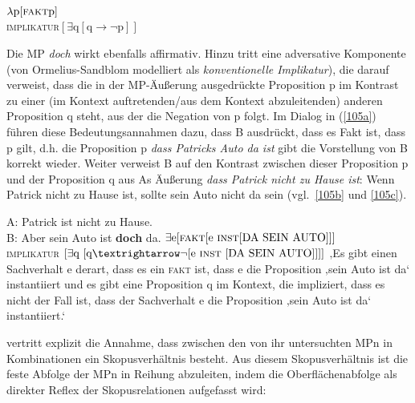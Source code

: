 \begin{exe}
	\ex\label{104} 
		$\lambda \textrm{p[\textsc{fakt}p}]$\\
		\textsc{implikatur}$[\exists \textrm{q}[\textrm{q} → \neg \textrm{p}]]$
			\hfill\hbox{\citet[83]{Ormelius-Sandblom1997}}
\end{exe}
Die MP \textit{doch} wirkt ebenfalls affirmativ. Hinzu tritt eine adversative Komponente (von Ormelius-Sandblom modelliert  als \textit{konventionelle Implikatur}), die darauf verweist, dass die in der MP-Äußerung ausgedrückte Proposition p im Kontrast zu einer (im Kontext auftretenden/aus dem Kontext abzuleitenden) anderen Proposition q steht, aus der die Negation von p folgt. Im Dialog in (\ref{105a}) führen diese Bedeutungsannahmen dazu, dass B ausdrückt, dass es Fakt ist, dass p gilt, d.h. die Proposition p \textit{dass Patricks Auto da ist} gibt die Vorstellung von B korrekt wieder. Weiter verweist B auf den Kontrast zwischen dieser Proposition p und der Proposition q aus As Äußerung \textit{dass Patrick nicht zu Hause ist}: Wenn Patrick nicht zu Hause ist, sollte sein Auto nicht da sein (vgl.\ \ref{105b} und \ref{105c}).

\begin{exe}
	\ex\label{105} 
		\begin{xlist}	
			\ex\label{105a} A: Patrick ist nicht zu Hause.\\
			 				B: Aber sein Auto ist \textbf{doch} da.                                   
			\hfill\hbox{\citet[83]{Ormelius-Sandblom1997}}
			\ex\label{105b} $\exists \textrm{e}[\textrm{\textsc{fakt}} [\textrm{e \textsc{inst}} [\textrm{DA SEIN AUTO}]]]$ \\
							\textsc{implikatur} $[\exists \textrm{q [q} → \neg [\textrm{e \textsc{inst} [DA SEIN AUTO}]]]]$			
			\ex\label{105c} ‚Es gibt einen Sachverhalt e derart, dass es ein \textsc{fakt} ist, dass e die Proposition ‚sein Auto ist da‘ instantiiert 							und es gibt eine Proposition q im Kontext, die impliziert, dass es nicht der Fall ist, dass der Sachverhalt e die Proposition 								‚sein Auto ist da‘ instantiiert.‘
		\end{xlist}
\end{exe}

\citet[92--93]{Ormelius-Sandblom1997} vertritt explizit die Annahme, dass zwischen den von ihr untersuchten MPn in Kombinationen ein Skopusverhältnis  besteht. Aus diesem Skopusverhältnis ist die feste Abfolge der MPn in Reihung abzuleiten, indem die Oberflächenabfolge als direkter Reflex der Skopusrelationen aufgefasst wird: 

